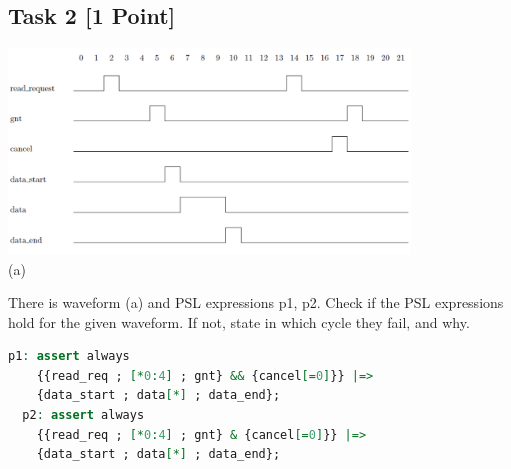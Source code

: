 \documentclass[12pt,epsf,makeidx,oneside]{book}
\begin{document}
\subsection{Task 2 [1 Point]}
\begin{center}
  \includegraphics[width=0.8\textwidth]{ex3_2} \\
  (a)
\end{center}
There is waveform (a) and PSL expressions p1, p2. Check if the PSL expressions hold for the given waveform. If not, state in which cycle they fail, and why.
\begin{lstlisting}[gobble=2,language=vhdl]
  p1: assert always
    {{read_req ; [*0:4] ; gnt} && {cancel[=0]}} |=>
    {data_start ; data[*] ; data_end};
  p2: assert always
    {{read_req ; [*0:4] ; gnt} & {cancel[=0]}} |=>
    {data_start ; data[*] ; data_end};
\end{lstlisting}



%   
\pagebreak
\end{document}
